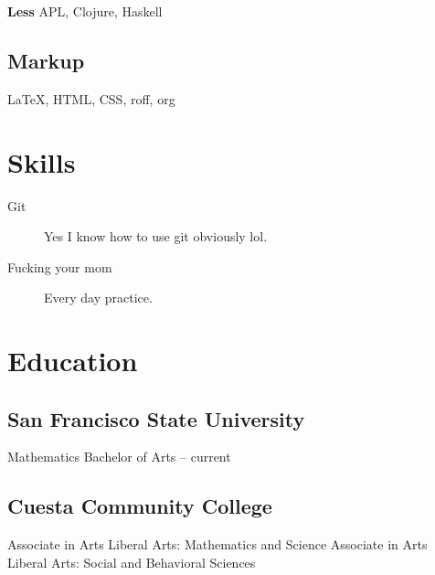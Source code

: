 {\bfseries Less} APL, Clojure, Haskell
\subsection{Markup}
{\LaTeX}, HTML, CSS, roff, org

\section{Skills}
\begin{description}
    \item[Git]{Yes I know how to use git obviously lol.}
    \item[Fucking your mom]{Every day practice.}
\end{description}

\section{Education}
\subsection{San Francisco State University}
Mathematics Bachelor of Arts -- current
\subsection{Cuesta Community College}
Associate in Arts
Liberal Arts: Mathematics and Science
Associate in Arts
Liberal Arts: Social and Behavioral Sciences




